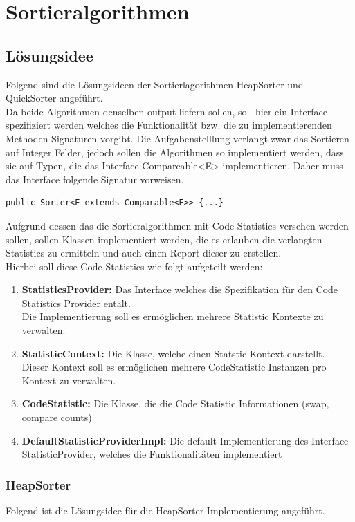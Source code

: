 \documentclass[11pt, a4paper, twoside]{article}   	%
\newcommand{\ideaSection}{Lösungsidee}
\begin{document}
\newpage
{\color{myred}
	\section
		{Sortieralgorithmen}
}
\subsection{\ideaSection}
Folgend sind die Lösungsideen der Sortierlagorithmen HeapSorter und QuickSorter angeführt.\\
Da beide Algorithmen denselben output liefern sollen, soll hier ein Interface spezifiziert werden welches die Funktionalität bzw. die zu implementierenden Methoden Signaturen vorgibt. Die Aufgabenstelllung verlangt zwar das Sortieren auf Integer Felder, jedoch sollen die Algorithmen so implementiert werden, dass sie auf Typen, die das Interface Compareable<E> implementieren. Daher muss das Interface folgende Signatur vorweisen.
\begin{lstlisting}
public Sorter<E extends Comparable<E>> {...}
\end{lstlisting}
Aufgrund dessen das die Sortieralgorithmen mit Code Statistics versehen werden sollen, sollen Klassen implementiert werden, die es erlauben die verlangten Statistics zu ermitteln und auch einen Report dieser zu erstellen.\\
Hierbei soll diese Code Statistics wie folgt aufgeteilt werden:
\begin{enumerate}
	\item \textbf{StatisticsProvider:} Das Interface welches die Spezifikation für den Code Statistics Provider entält.\\
	Die Implementierung soll es ermöglichen mehrere Statistic Kontexte zu verwalten.
	\item \textbf{StatisticContext:} Die Klasse, welche einen Statstic Kontext darstellt.\\
	Dieser Kontext soll es ermöglichen mehrere CodeStatistic Instanzen pro Kontext zu verwalten.
	\item \textbf{CodeStatistic:} Die Klasse, die die Code Statistic Informationen (swap, compare counts)
	\item \textbf{DefaultStatisticProviderImpl:} Die default Implementierung des Interface StatisticProvider, welches die Funktionalitäten implementiert
\end{enumerate}
\subsubsection{HeapSorter}
Folgend ist die Lösungsidee für die HeapSorter Implementierung angeführt.\\
\end{document}
